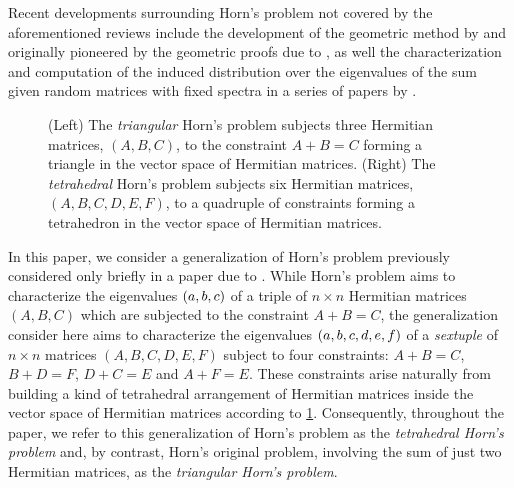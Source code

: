 \documentclass[notitlepage, 10pt]{article}
\begin{document}
Recent developments surrounding Horn's problem not covered by the aforementioned reviews include the development of the geometric method by \citeauthor{sherman2015geometric} \cite{sherman2015geometric} and \citeauthor{berline2018horn} \cite{berline2018horn} originally pioneered by the geometric proofs due to \citeauthor{belkale2002geometric} \cite{belkale2002geometric,belkale2005geometric}, as well the characterization and computation of the induced distribution over the eigenvalues of the sum given random matrices with fixed spectra in a series of papers by \citeauthor{coquereaux2018orbital} \cite{coquereaux2018orbital,coquereaux2018orbital,coquereaux2019revisiting,zuber2018horn}.
\begin{center}%
    \begin{figure}%
        \caption{(Left) The \textit{triangular} Horn's problem subjects three Hermitian matrices, $(A,B,C)$, to the constraint $A+B=C$ forming a triangle in the vector space of Hermitian matrices. (Right) The \textit{tetrahedral} Horn's problem subjects six Hermitian matrices, $(A,B,C,D,E,F)$, to a quadruple of constraints forming a tetrahedron in the vector space of Hermitian matrices.}%
        \label{fig:tetrahedron_labelling_scheme}%
    \end{figure}%
\end{center}%
In this paper, we consider a generalization of Horn's problem previously considered only briefly in a paper due to \citeauthor{christandl2018recoupling} \cite{christandl2018recoupling}.
While Horn's problem aims to characterize the eigenvalues $(a, b, c)$ of a triple of $n\times n$ Hermitian matrices $(A,B,C)$ which are subjected to the constraint $A+B=C$, the generalization consider here aims to characterize the eigenvalues $(a,b,c,d,e,f)$ of a \textit{sextuple} of $n\times n$ matrices $(A,B,C,D,E,F)$ subject to four constraints: $A+B=C$, $B+D=F$, $D+C=E$ and $A+F=E$.
These constraints arise naturally from building a kind of tetrahedral arrangement of Hermitian matrices inside the vector space of Hermitian matrices according to \cref{fig:tetrahedron_labelling_scheme}.
Consequently, throughout the paper, we refer to this generalization of Horn's problem as the \textit{tetrahedral Horn's problem} and, by contrast, Horn's original problem, involving the sum of just two Hermitian matrices, as the \textit{triangular Horn's problem}.
\end{document}
